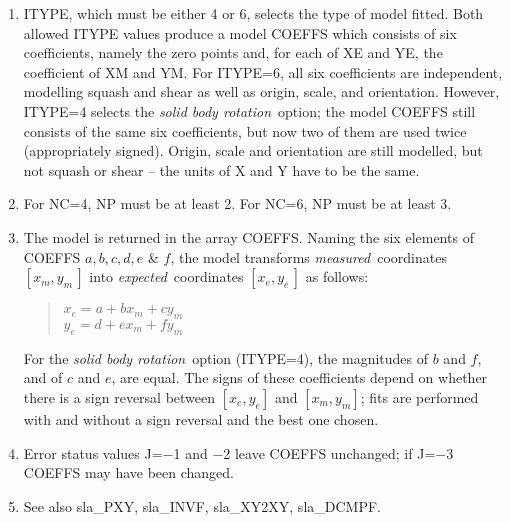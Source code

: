 {
 \begin{enumerate}
  \item ITYPE, which must be either 4 or 6, selects the type of model
        fitted.  Both allowed ITYPE values produce a model COEFFS which
        consists of six coefficients, namely the zero points and, for
        each of XE and YE, the coefficient of XM and YM.  For ITYPE=6,
        all six coefficients are independent, modelling squash and shear
        as well as origin, scale, and orientation.  However, ITYPE=4
        selects the {\it solid body rotation}\, option;  the model COEFFS
        still consists of the same six coefficients, but now two of
        them are used twice (appropriately signed).  Origin, scale
        and orientation are still modelled, but not squash or shear --
        the units of X and Y have to be the same.
  \item For NC=4, NP must be at least 2.  For NC=6, NP must be at
        least 3.
  \item The model is returned in the array COEFFS.  Naming the
        six elements of COEFFS $a,b,c,d,e$ \& $f$,
        the model transforms {\it measured}\, coordinates
        $[x_{m},y_{m}\,]$ into {\it expected}\, coordinates
        $[x_{e},y_{e}\,]$ as follows:
        \begin{verse}
         $x_{e} = a + bx_{m} + cy_{m}$ \\
         $y_{e} = d + ex_{m} + fy_{m}$
        \end{verse}
        For the {\it solid body rotation}\, option (ITYPE=4), the
        magnitudes of $b$ and $f$, and of $c$ and $e$, are equal.  The
        signs of these coefficients depend on whether there is a
        sign reversal between $[x_{e},y_{e}]$ and $[x_{m},y_{m}]$;
        fits are performed
        with and without a sign reversal and the best one chosen.
  \item Error status values J=$-$1 and $-$2 leave COEFFS unchanged;
        if J=$-$3 COEFFS may have been changed.
  \item See also sla\_PXY, sla\_INVF, sla\_XY2XY, sla\_DCMPF.
 \end{enumerate}
}
{
}
